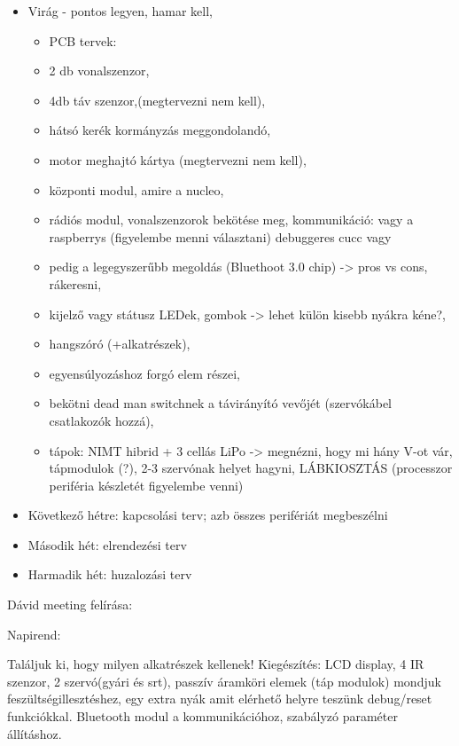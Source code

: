 \documentclass{article}
\begin{document}
\begin{itemize}
\item Virág - pontos legyen, hamar kell, 
\begin{itemize}
    \item PCB tervek: 
    \item2 db vonalszenzor, 
    \item4db táv szenzor,(megtervezni nem kell), 
    \item hátsó kerék kormányzás meggondolandó, 
    \item motor meghajtó kártya (megtervezni nem kell), 
    \item központi modul, amire a nucleo, 
    \item rádiós modul, vonalszenzorok bekötése meg, kommunikáció: vagy a raspberrys (figyelembe menni választani) debuggeres cucc vagy  
    \item pedig a legegyszerűbb megoldás (Bluethoot 3.0 chip) -> pros vs cons, rákeresni, 
    \item kijelző vagy státusz LEDek, gombok -> lehet külön kisebb nyákra kéne?, 
    \item hangszóró (+alkatrészek), 
    \item egyensúlyozáshoz forgó elem részei, 
    \item bekötni dead man switchnek a távirányító vevőjét (szervókábel csatlakozók hozzá), 
    \item tápok: NIMT hibrid + 3 cellás LiPo -> megnézni, hogy mi hány V-ot vár, tápmodulok (?), 2-3 szervónak helyet hagyni, LÁBKIOSZTÁS (processzor periféria készletét figyelembe venni)
\end{itemize}
\item Következő hétre: kapcsolási terv; azb összes perifériát megbeszélni
\item Második hét: elrendezési terv
\item Harmadik hét: huzalozási terv
\end{itemize}

Dávid meeting felírása:

\vspace{5mm} %

Napirend:

Találjuk ki, hogy milyen alkatrészek kellenek!
Kiegészítés: LCD display, 4 IR szenzor, 2 szervó(gyári és srt), passzív áramköri elemek (táp modulok) mondjuk feszültségillesztéshez, egy extra nyák amit elérhető helyre teszünk debug/reset funkciókkal. Bluetooth modul a kommunikációhoz, szabályzó paraméter állításhoz.

\vspace{5mm} %
\end{document}

